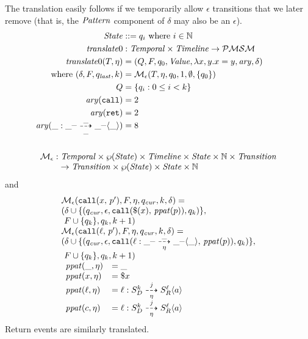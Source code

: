 \documentclass[preprint,onecolumn,9pt]{sigplanconf} %
\begin{document}
The translation easily follows if we temporarily allow $\epsilon$ transitions that we later remove (that is, the $\mathit{Pattern}$ component of $\delta$ may also be an $\epsilon$).
%
\begin{align*}
 \State &::= q_i \text{ where } i \in \Nat
\\
 \translateeps &: \TContract \times \Timeline \to \PMSM
\\
 \translateeps(\mtcon, \mtimeline) &= (Q, F, \pmsmq_0, \Value, \lambda x,y . x = y, \ary, \delta) \\
 \text{where }
   (\delta, F, \pmsmqlast, k) &= \epshelp(\mtcon, \mtimeline, \pmsmq_0, 1, \emptyset, \setof{\pmsmq_0})
\\
   Q &= \setbuild{\pmsmq_i}{0 \le i < k}
\\
   \ary(\apvcallalone) &= 2 \\
   \ary(\apvretalone) &= 2 \\
   \ary(\bclos{\swc}{\swc}{\swc}{\swc}{\swc}{\swc}{\swc}{\swc}) &= 8 \\
\\
\begin{array}{l}
    \epshelp : \TContract \times \wp(\State) \times \Timeline \times \State \times \Nat \times \mathit{Transition} \\ \phantom{\epshelp :}\to \mathit{Transition} \times \wp(\State) \times \State \times \Nat
\end{array}\span\omit
\end{align*}
and
\begin{align*}
\begin{array}{l}
  \epshelp(\scallev{\mvar}{\mvpat'}, F, \mtimeline, \pmsmqcur, k, \delta) = \\
           (\delta
            \cup \setof{(\pmsmqcur,
                         \epsilon,
                         \apvcall{\sref(\mvar)}{\mathit{ppat}(\mvpat)},
                         \pmsmq_k)}, \\
            \ F\cup \setof{\pmsmq_k}, \pmsmq_k, k+1)
\\
%
  \epshelp(\scallev{\mtoplevelname}{\mvpat'}, F, \mtimeline, \pmsmqcur, k, \delta) = \\
           (\delta
            \cup \setof{(\pmsmqcur,
                         \epsilon,
                         \apvcall{\bclos{\mtoplevelname}{\swc}{\swc}{\swc}{\mtimeline}{\swc}{\swc}{\swc}}{\mathit{ppat}(\mvpat)},
                         \pmsmq_k)}, \\
            \ F\cup \setof{\pmsmq_k}, \pmsmq_k, k+1)
\\
\begin{array}{ll}
  \mathit{ppat}(\swc, \mtimeline) &= \swc
\\
  \mathit{ppat}(\mvar, \mtimeline) &= \sref{\mvar}
\\
  \mathit{ppat}(\mtoplevelname, \mtimeline) &= \bclos{\mtoplevelname}{\mscon_D}{k}{j}{\mtimeline}{\mscon_R}{\mmlab}{\maddr} \\
  \mathit{ppat}(\mconstant, \mtimeline) &= \bclos{\mtoplevelname}{\mscon_D}{k}{j}{\mtimeline}{\mscon_R}{\mmlab}{\maddr}
\end{array}
\end{array}
\end{align*}
Return events are similarly translated.
\end{document}
